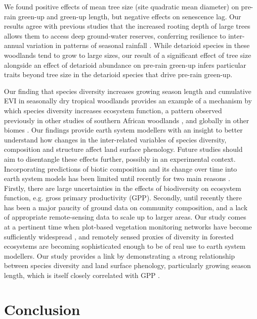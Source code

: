\documentclass[11pt,a4paper]{article}
\begin{document}
We found positive effects of mean tree size (site quadratic mean diameter) on
pre-rain green-up and green-up length, but negative effects on senescence lag.
Our results agree with previous studies that the increased rooting depth of
large trees allows them to access deep ground-water reserves, conferring
resilience to inter-annual variation in patterns of seasonal rainfall
\citep{Holdo2017}. While detarioid species in these woodlands tend to grow to
large sizes, our result of a significant effect of tree size alongside an
effect of detarioid abundance on pre-rain green-up infers particular traits
beyond tree size in the detarioid species that drive pre-rain green-up.

Our finding that species diversity increases growing season length and
cumulative EVI in seasonally dry tropical woodlands provides an example of a
mechanism by which species diversity increases ecosystem function, a pattern
observed previously in other studies of southern African woodlands
\citep{Godlee2021, McNicol2018, Shirima2015}, and globally in other biomes
\citep{Plas2019, Tilman2014}. Our findings provide earth system modellers with
an insight to better understand how changes in the inter-related variables of
species diversity, composition and structure affect land surface phenology.
Future studies should aim to disentangle these effects further, possibly in an
experimental context. Incorporating predictions of biotic composition and its
change over time into earth system models has been limited until recently for
two main reasons \citep{Ahlstrom2015, Bodegom2011}. Firstly, there are large
uncertainties in the effects of biodiversity on ecosystem function, e.g. gross
primary productivity (GPP). Secondly, until recently there has been a major
paucity of ground data on community composition, and a lack of appropriate
remote-sensing data to scale up to larger areas. Our study comes at a pertinent
time when plot-based vegetation monitoring networks have become sufficiently
widespread \citep{ForestPlotsnet2021, SEOSAW2020}, and remotely sensed proxies
of diversity in forested ecosystems are becoming sophisticated enough
\citep{Schneider2017, Cavendar2020} to be of real use to earth system
modellers. Our study provides a link by demonstrating a strong relationship
between species diversity and land surface phenology, particularly growing
season length, which is itself closely correlated with GPP
\citep{Sjostrom2011}. 

\section{Conclusion}
\end{document}

